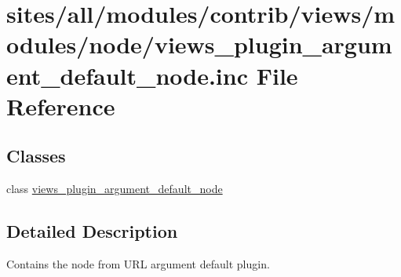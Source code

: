 \hypertarget{views__plugin__argument__default__node_8inc}{
\section{sites/all/modules/contrib/views/modules/node/views\_\-plugin\_\-argument\_\-default\_\-node.inc File Reference}
\label{views__plugin__argument__default__node_8inc}
}
\subsection*{Classes}
\begin{CompactItemize}
\item 
class \hyperlink{classviews__plugin__argument__default__node}{views\_\-plugin\_\-argument\_\-default\_\-node}
\end{CompactItemize}


\subsection{Detailed Description}
Contains the node from URL argument default plugin. 